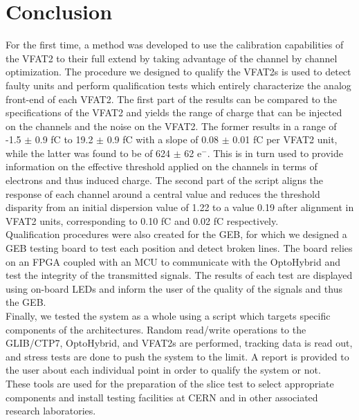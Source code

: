   \section{Conclusion}

    For the first time, a method was developed to use the calibration capabilities of the VFAT2 to their full extend by taking advantage of the channel by channel optimization. The procedure we designed to qualify the VFAT2s is used to detect faulty units and perform qualification tests which entirely characterize the analog front-end of each VFAT2. The first part of the results can be compared to the specifications of the VFAT2 and yields the range of charge that can be injected on the channels and the noise on the VFAT2. The former results in a range of -1.5 $\pm$ 0.9 fC to 19.2 $\pm$ 0.9 fC with a slope of 0.08 $\pm$ 0.01 fC per VFAT2 unit, while the latter was found to be of 624 $\pm$ 62 e$^-$. This is in turn used to provide information on the effective threshold applied on the channels in terms of electrons and thus induced charge. The second part of the script aligns the response of each channel around a central value and reduces the threshold disparity from an initial dispersion value of 1.22 to a value 0.19 after alignment in VFAT2 units, corresponding to 0.10 fC and 0.02 fC respectively. \\

    Qualification procedures were also created for the GEB, for which we designed a GEB testing board to test each position and detect broken lines. The board relies on an FPGA coupled with an MCU to communicate with the OptoHybrid and test the integrity of the transmitted signals. The results of each test are displayed using on-board LEDs and inform the user of the quality of the signals and thus the GEB. \\

    Finally, we tested the system as a whole using a script which targets specific components of the architectures. Random read/write operations to the GLIB/CTP7, OptoHybrid, and VFAT2s are performed, tracking data is read out, and stress tests are done to push the system to the limit. A report is provided to the user about each individual point in order to qualify the system or not. \\

    These tools are used for the preparation of the slice test to select appropriate components and install testing facilities at CERN and in other associated research laboratories.
